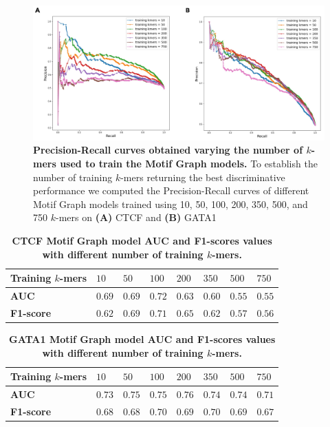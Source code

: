 \documentclass[a4paper, titlepage, openright]{book}
\begin{document}
\begin{figure}
	\centering
	\includegraphics[width=\textwidth]{figures/dp_mg.jpg}
	\caption[Precision-Recall curves obtained varying the number of $k$-mers used to train the Motif Graph models.]{\textbf{Precision-Recall curves obtained varying the number of $k$-mers used to train the Motif Graph models.} To establish the number of training $k$-mers returning the best discriminative performance we computed the Precision-Recall curves of different Motif Graph models trained using 10, 50, 100, 200, 350, 500, and 750 $k$-mers on \textbf{(A)} CTCF and \textbf{(B)} GATA1}
	\label{fig:dp_mg}
\end{figure} 
\begin{table}
	\centering
	\begin{tabular}{|p{3cm}|p{}|p{}|p{}|p{}|p{}|p{}|p{}|}
		\hline
		\textbf{Training $k$-mers}& \textbf{$10$}& \textbf{$50$}& \textbf{$100$}& \textbf{$200$}& \textbf{$350$}& \textbf{$500$}& \textbf{$750$} \\
		\hline
		\textbf{AUC}& $0.69$& $0.69$& $0.72$& $0.63$& $0.60$& $0.55$& $0.55$\\
		\hline
		\textbf{F1-score}& $0.62$& $0.69$& $0.71$& $0.65$& $0.62$& $0.57$& $0.56$\\
		\hline
	\end{tabular}
	\caption[CTCF Motif Graph model AUC and F1-scores values with different number of training $k$-mers.]{\textbf{CTCF Motif Graph model AUC and F1-scores values with different number of training $k$-mers.}}
	\label{table:ctcf_auc_f1}
\end{table}
\begin{table}
	\centering
	\begin{tabular}{|p{3cm}|p{}|p{}|p{}|p{}|p{}|p{}|p{}|}
		\hline
		\textbf{Training $k$-mers}& \textbf{$10$}& \textbf{$50$}& \textbf{$100$}& \textbf{$200$}& \textbf{$350$}& \textbf{$500$}& \textbf{$750$} \\
		\hline
		\textbf{AUC}& $0.73$& $0.75$& $0.75$& $0.76$& $0.74$& $0.74$& $0.71$\\
		\hline
		\textbf{F1-score}& $0.68$& $0.68$& $0.70$& $0.69$& $0.70$& $0.69$& $0.67$\\
		\hline
	\end{tabular}
	\caption[GATA1 Motif Graph model AUC and F1-scores values with different number of training $k$-mers.]{\textbf{GATA1 Motif Graph model AUC and F1-scores values with different number of training $k$-mers.}}
	\label{table:gata1_auc_f1}
\end{table}
\end{document}
